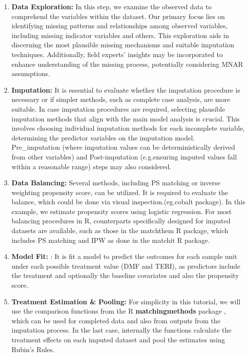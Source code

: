 \documentclass[
  letterpaper,
  DIV=11,
  numbers=noendperiod]{scrreprt}
\providecommand{\tightlist}{%
  \setlength{\itemsep}{0pt}\setlength{\parskip}{0pt}}\usepackage{longtable,booktabs,array}
\begin{document}
\begin{enumerate}
\def\labelenumi{\arabic{enumi}.}
\tightlist
\item
  \textbf{Data Exploration:} In this step, we examine the observed data
  to comprehend the variables within the dataset. Our primary focus lies
  on identifying missing patterns and relationships among observed
  variables, including missing indicator variables and others. This
  exploration aids in discerning the most plausible missing mechanisms
  and suitable imputation techniques. Additionally, field experts'
  insights may be incorporated to enhance understanding of the missing
  process, potentially considering MNAR assumptions.
\item
  \textbf{Imputation:} It is essential to evaluate whether the
  imputation procedure is necessary or if simpler methods, such as
  complete case analysis, are more suitable. In case imputation
  procedures are required, selecting plausible imputation methods that
  align with the main model analysis is crucial. This involves choosing
  individual imputation methods for each incomplete variable,
  determining the predictor variables on the imputation model.
  Pre\_imputation (where imputation values can be deterministically
  derived from other variables) and Post-imputation (e.g.ensuring
  imputed values fall within a reasonable range) steps may also
  considered.
\item
  \textbf{Data Balancing:} Several methods, including PS matching or
  inverse weighting propensity score, can be utilized. It is required to
  evaluate the balance, which could be done via visual
  inspection.(eg.cobalt package). In this example, we estimate
  propensity scores using logistic regression. For most balancing
  procedures in R, counterparts specifically designed for imputed
  datasets are available, such as those in the matchthem R package,
  which includes PS matching and IPW as done in the matchit R package.
\item
  \textbf{Model Fit:} : It is fit a model to predict the outcomes for
  each sample unit under each possible treatment value (DMF and TERI),
  as predictors include the treatment and optionally the baseline
  covariates and also the propensity score.
\item
  \textbf{Treatment Estimation \& Pooling:} For simplicity in this
  tutorial, we will use the comparison functions from the R
  \textbf{matchingmethods} package \cite{arel_marginaleffects_2023},
  which can be used for completed data and also from outputs from the
  imputation process. In the last case, internally the functions
  calculate the treatment effects on each imputed dataset and pool the
  estimates using Rubin's Rules.
\end{enumerate}
\end{document}
